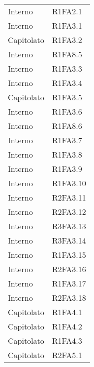 {\begin{longtable}{ C{4cm} C{4cm}}
Interno & R1FA2.1\\

Interno & R1FA3.1\\

Capitolato & R1FA3.2\\

Interno & R1FA8.5\\

Interno & R1FA3.3\\

Interno & R1FA3.4\\


Capitolato & R1FA3.5\\

Interno & R1FA3.6\\

Interno & R1FA8.6\\

Interno & R1FA3.7\\

Interno & R1FA3.8\\

Interno & R1FA3.9\\

Interno & R1FA3.10\\

Interno & R2FA3.11\\

Interno & R2FA3.12\\

Interno & R3FA3.13\\


Interno & R3FA3.14\\

Interno & R1FA3.15\\

Interno & R2FA3.16\\

Interno & R1FA3.17\\

Interno & R2FA3.18\\

Capitolato & R1FA4.1\\

Capitolato & R1FA4.2\\

Capitolato & R1FA4.3\\

Capitolato & R2FA5.1\\


\end{longtable}}
